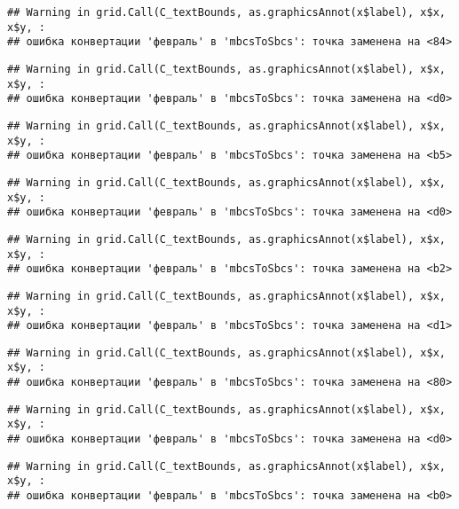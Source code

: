 \documentclass[
]{article}
\begin{document}
\begin{verbatim}
## Warning in grid.Call(C_textBounds, as.graphicsAnnot(x$label), x$x, x$y, :
## ошибка конвертации 'февраль' в 'mbcsToSbcs': точка заменена на <84>
\end{verbatim}

\begin{verbatim}
## Warning in grid.Call(C_textBounds, as.graphicsAnnot(x$label), x$x, x$y, :
## ошибка конвертации 'февраль' в 'mbcsToSbcs': точка заменена на <d0>
\end{verbatim}

\begin{verbatim}
## Warning in grid.Call(C_textBounds, as.graphicsAnnot(x$label), x$x, x$y, :
## ошибка конвертации 'февраль' в 'mbcsToSbcs': точка заменена на <b5>
\end{verbatim}

\begin{verbatim}
## Warning in grid.Call(C_textBounds, as.graphicsAnnot(x$label), x$x, x$y, :
## ошибка конвертации 'февраль' в 'mbcsToSbcs': точка заменена на <d0>
\end{verbatim}

\begin{verbatim}
## Warning in grid.Call(C_textBounds, as.graphicsAnnot(x$label), x$x, x$y, :
## ошибка конвертации 'февраль' в 'mbcsToSbcs': точка заменена на <b2>
\end{verbatim}

\begin{verbatim}
## Warning in grid.Call(C_textBounds, as.graphicsAnnot(x$label), x$x, x$y, :
## ошибка конвертации 'февраль' в 'mbcsToSbcs': точка заменена на <d1>
\end{verbatim}

\begin{verbatim}
## Warning in grid.Call(C_textBounds, as.graphicsAnnot(x$label), x$x, x$y, :
## ошибка конвертации 'февраль' в 'mbcsToSbcs': точка заменена на <80>
\end{verbatim}

\begin{verbatim}
## Warning in grid.Call(C_textBounds, as.graphicsAnnot(x$label), x$x, x$y, :
## ошибка конвертации 'февраль' в 'mbcsToSbcs': точка заменена на <d0>
\end{verbatim}

\begin{verbatim}
## Warning in grid.Call(C_textBounds, as.graphicsAnnot(x$label), x$x, x$y, :
## ошибка конвертации 'февраль' в 'mbcsToSbcs': точка заменена на <b0>
\end{verbatim}
\end{document}
